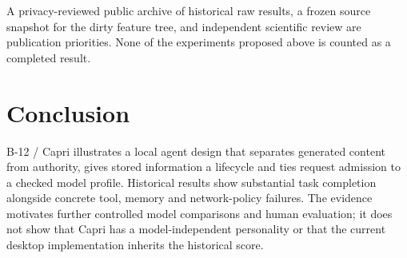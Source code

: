\documentclass[11pt,a4paper]{article}
\begin{document}
A privacy-reviewed public archive of historical raw results, a frozen source snapshot for the dirty feature tree, and independent scientific review are publication priorities. None of the experiments proposed above is counted as a completed result.

\section{Conclusion}
B-12 / Capri illustrates a local agent design that separates generated content from authority, gives stored information a lifecycle and ties request admission to a checked model profile. Historical results show substantial task completion alongside concrete tool, memory and network-policy failures. The evidence motivates further controlled model comparisons and human evaluation; it does not show that Capri has a model-independent personality or that the current desktop implementation inherits the historical score.



\end{document}
